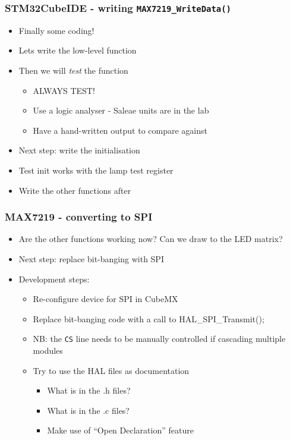 \documentclass[14pt]{beamer}
\begin{document}
\begin{frame}[fragile]
\frametitle{STM32CubeIDE - writing \texttt{MAX7219\_WriteData()}}
\begin{itemize}
\item Finally some coding!
\item Lets write the low-level function
\item Then we will \textit{test} the function
	\begin{itemize}
		\item ALWAYS TEST!
		\item Use a logic analyser - Saleae units are in the lab
		\item Have a hand-written output to compare against
	\end{itemize}
\pause
\item Next step: write the initialisation
\item Test init works with the lamp test register
\item Write the other functions after
\end{itemize}
\end{frame}

\begin{frame}[fragile]
\frametitle{MAX7219 - converting to SPI}
\begin{itemize}
\item Are the other functions working now? Can we draw to the LED matrix?
\item Next step: replace bit-banging with SPI
\item Development steps:
	\begin{itemize}
	\item Re-configure device for SPI in CubeMX
	\item Replace bit-banging code with a call to HAL\_SPI\_Transmit();
	\item NB: the \texttt{CS} line needs to be manually controlled if cascading multiple modules
	\item Try to use the HAL files as documentation
	\begin{itemize}
		\item What is in the .h files?
		\item What is in the .c files?
		\item Make use of ``Open Declaration'' feature
	\end{itemize}
	\end{itemize}
\end{itemize}
\end{frame}
\end{document}
